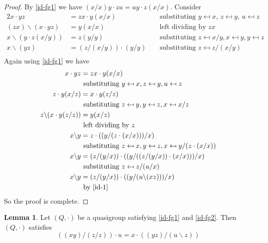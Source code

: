 \documentclass[12pt, twoside, openright]{report}
\theoremstyle{definition}
\newtheorem{lem}[thm]{Lemma}
\newcommand{\ldv}{\backslash}       %
\newcommand{\rdv}{/}                %
\begin{document}
\begin{proof}
  By \ref{id-fg1} we have $(x\rdv x)y\cdot zu = uy \cdot z(x\rdv x)$. Consider
  \begin{alignat*}{2}
    x\cdot yz &= zx\cdot y(x\rdv x) &&\text{ substituting $y\mapsfrom x$, $z\mapsfrom y$, $u\mapsfrom z$}\\
    (zx)\ldv (x\cdot yz) &= y(x\rdv x) &&\text{ left dividing by $zx$}\\
    x\ldv(y\cdot z(x\rdv y)) &= z(y\rdv y) &&\text{ substituting $z\mapsfrom x\rdv y, x\mapsfrom y, y\mapsfrom z$}\\
    x\ldv (yz) &= (z\rdv(x\rdv y))\cdot (y\rdv y) &&\text{ substituting $z\mapsfrom z\rdv(x\rdv y)$}\label{id-1} \tag{I}\\
  \end{alignat*}
  Again using \ref{id-fg1} we have
  \begin{align*}
    x\cdot yz &= zx\cdot y(x\rdv x)\\
      &\text{ substituting $y\mapsfrom x, z\mapsfrom y, u\mapsfrom z$}\\
    z\cdot y(x\rdv z) &= x\cdot y(z\rdv z)\\
      &\text{ substituting $z\mapsfrom y, y\mapsfrom z, x\mapsfrom x\rdv z$}\\
    z\ldv (x\cdot y(z\rdv z)) &= y(x\rdv z)\\
      &\text{ left dividing by $z$}\\
    x\ldv y &= z\cdot ((y\rdv(z\cdot (x\rdv x)))\rdv x)\\
      &\text{ substituting $z\mapsfrom x, y\mapsfrom z, x\mapsfrom y\rdv (z\cdot (x\rdv x))$}\\
    x\ldv y &= (z\rdv(y\rdv x))\cdot ((y\rdv((z\rdv(y\rdv x))\cdot (x\rdv x)))\rdv x)\\
      &\text{ substituting $z\mapsfrom z\rdv (u\rdv x)$}\\
    x\ldv y &= (z\rdv (y\rdv x))\cdot ((y\rdv (u\ldv(xz)))\rdv x)\\
      &\text{ by \ref{id-1}}
  \end{align*}
  So the proof is complete.
\end{proof}

\begin{lem}\label{lem-40}
  Let $(Q, \cdot)$ be a quasigroup satisfying \ref{id-fg1} and \ref{id-fg2}.
    Then $(Q, \cdot)$ satisfies
  \[((xy)\rdv (z\rdv z))\cdot u = x\cdot ((yz)\rdv (u\ldv z))\]
\end{lem}
\end{document}
